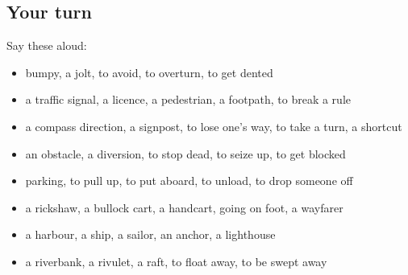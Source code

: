 \subsection*{Your turn}
Say these aloud:

\begin{itemize}
\raggedright
  \item bumpy, a jolt, to avoid, to overturn, to get dented
  \item a traffic signal, a licence, a pedestrian, a footpath, to break a rule
  \item a compass direction, a signpost, to lose one's way, to take a turn, a shortcut
  \item an obstacle, a diversion, to stop dead, to seize up, to get blocked
  \item parking, to pull up, to put aboard, to unload, to drop someone off
  \item a rickshaw, a bullock cart, a handcart, going on foot, a wayfarer
  \item a harbour, a ship, a sailor, an anchor, a lighthouse
  \item a riverbank, a rivulet, a raft, to float away, to be swept away
\end{itemize}

